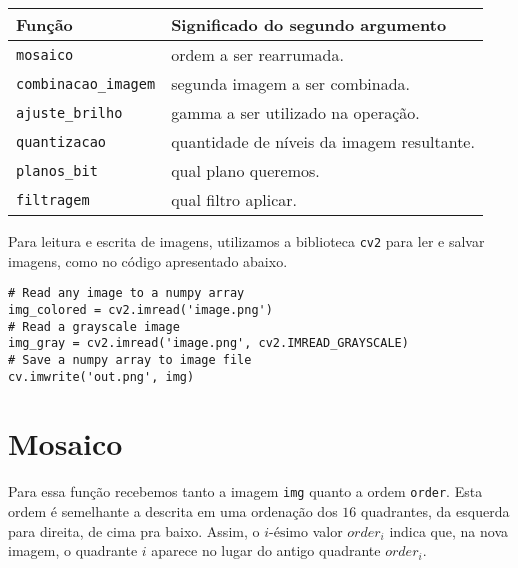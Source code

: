 \documentclass[11pt]{article}
\begin{document}
\begin{table}[htbp]
\label{tab}
\centering
\begin{tabular}{ll}
Função & Significado do segundo argumento\\[0pt]
\hline
\texttt{mosaico} & ordem a ser rearrumada.\\[0pt]
\texttt{combinacao\_imagem} & segunda imagem a ser combinada.\\[0pt]
\texttt{ajuste\_brilho} & gamma a ser utilizado na operação.\\[0pt]
\texttt{quantizacao} & quantidade de níveis da imagem resultante.\\[0pt]
\texttt{planos\_bit} & qual plano queremos.\\[0pt]
\texttt{filtragem} & qual filtro aplicar.\\[0pt]
\end{tabular}
\end{table}

Para leitura e escrita de imagens, utilizamos a biblioteca \texttt{cv2} para ler e salvar imagens, como no código apresentado abaixo.
\begin{verbatim}
# Read any image to a numpy array
img_colored = cv2.imread('image.png')
# Read a grayscale image
img_gray = cv2.imread('image.png', cv2.IMREAD_GRAYSCALE)
# Save a numpy array to image file
cv.imwrite('out.png', img)
\end{verbatim}

\section*{Mosaico}
\label{sec:orgedb4092}
Para essa função recebemos tanto a imagem \texttt{img} quanto a ordem \texttt{order}.
Esta ordem é semelhante a descrita em uma ordenação dos \(16\) quadrantes, da esquerda para direita, de cima pra baixo.
Assim, o \(i\text{-ésimo}\) valor \(order_i\) indica que, na nova imagem, o quadrante \(i\) aparece no lugar do antigo quadrante \(order_i\).
\end{document}
